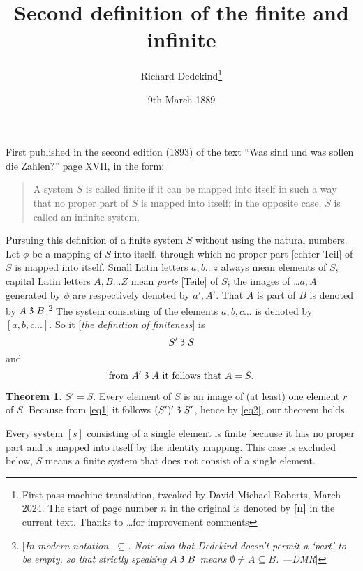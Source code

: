 \documentclass[leqno]{article}
\theoremstyle{definition}
\newtheorem{theorem}{Theorem}
\newcommand\partof{\mathrel{\raisebox{0.45ex}{$\mathfrak{3}$}}}
\begin{document}
\title{Second definition of the finite and infinite}
\author{Richard Dedekind\thanks{First pass machine translation, tweaked by David Michael Roberts, March 2024. The start of page number $n$ in the original is denoted by \textbf{[n]} in the current text. Thanks to \ldots for improvement comments}}
\date{9th March 1889}
\maketitle

First published in the second edition (1893) of the text ``Was sind und was sollen die Zahlen?'' page XVII, in the form: 

\begin{quote}
A system $S$ is called finite if it can be mapped into itself in such a way that no proper part of $S$ is mapped into itself; in the opposite case, $S$ is called an infinite system.
\end{quote}

Pursuing this definition of a finite system $S$ without using the natural numbers. 
Let $\phi$ be a mapping of $S$ into itself, through which no proper part [echter Teil] of $S$ is mapped into itself.
Small Latin letters $a, b \ldots z$ always mean elements of $S$, capital Latin letters $A, B \ldots Z$ mean \emph{parts} [Teile] of $S$; the images of \ldots $a, A$ generated by $\phi$ are respectively denoted by $a', A'$. 
That $A$ is part of $B$ is denoted by $A \partof B$.\footnote{[\emph{In modern notation, $\subseteq$. Note also that Dedekind doesn't permit a `part' to be empty, so that strictly speaking $A\partof B$ means $\emptyset \neq A \subseteq B$. ---DMR}]} The system consisting of the elements $a, b, c\ldots $ is denoted by $[a, b, c \ldots]$. 
So it [\emph{the definition of finiteness}] is
\begin{equation}\label{eq1}
				S' \partof S 
\end{equation}
and
\begin{equation}\label{eq2}
		\text{from } A' \partof A \text{ it follows that } A = S.
\end{equation}

\begin{theorem}\label{thm1}
$S' = S$. Every element of $S$ is an image of (at least) one element $r$ of $S$. Because from \eqref{eq1} it follows $(S')' \partof S'$, hence by \eqref{eq2}, our theorem holds.
\end{theorem}

Every system $[s]$ consisting of a single element is finite because it has no proper part and is mapped into itself by the identity mapping. 
This case is excluded below, $S$ means a finite system that does not consist of a single element.
\end{document}
